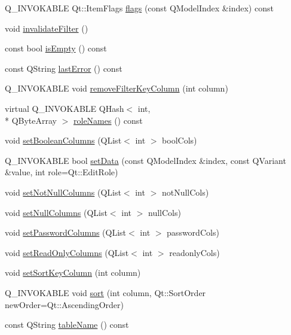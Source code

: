 \begin{DoxyCompactItemize}
\item 
Q\-\_\-\-I\-N\-V\-O\-K\-A\-B\-L\-E Qt\-::\-Item\-Flags \hyperlink{classSH__ExtendedProxyModel_aa12f3d989293da24fb47fd96a080cdc0}{flags} (const Q\-Model\-Index \&index) const 
\item 
void \hyperlink{classSH__ExtendedProxyModel_a7cfb1803f839023c7ba6fc67b900d76a}{invalidate\-Filter} ()
\item 
const bool \hyperlink{classSH__ExtendedProxyModel_af8e37132288a46f527be0c67b652fdf5}{is\-Empty} () const 
\item 
const Q\-String \hyperlink{classSH__ExtendedProxyModel_afb11fa89e1181d88843ea0f7fb3fe654}{last\-Error} () const 
\item 
Q\-\_\-\-I\-N\-V\-O\-K\-A\-B\-L\-E void \hyperlink{classSH__ExtendedProxyModel_a631c2a56b4a301b9c8a855facec3ac1c}{remove\-Filter\-Key\-Column} (int column)
\item 
virtual Q\-\_\-\-I\-N\-V\-O\-K\-A\-B\-L\-E Q\-Hash$<$ int, \\*
Q\-Byte\-Array $>$ \hyperlink{classSH__ExtendedProxyModel_aead7c7969b112c3d0443051ae6a4757a}{role\-Names} () const 
\item 
void \hyperlink{classSH__ExtendedProxyModel_a2acefd1604abfef312fdaa65e57c2234}{set\-Boolean\-Columns} (Q\-List$<$ int $>$ bool\-Cols)
\item 
Q\-\_\-\-I\-N\-V\-O\-K\-A\-B\-L\-E bool \hyperlink{classSH__ExtendedProxyModel_aaaddcc27fdce4ef70f242460b8e053da}{set\-Data} (const Q\-Model\-Index \&index, const Q\-Variant \&value, int role=Qt\-::\-Edit\-Role)
\item 
void \hyperlink{classSH__ExtendedProxyModel_a9211b1bc09442298367565d7e0f62de4}{set\-Not\-Null\-Columns} (Q\-List$<$ int $>$ not\-Null\-Cols)
\item 
void \hyperlink{classSH__ExtendedProxyModel_a2a5734c26bb72fb11e50b9036914d987}{set\-Null\-Columns} (Q\-List$<$ int $>$ null\-Cols)
\item 
void \hyperlink{classSH__ExtendedProxyModel_a4bbea95e7483aeeef4709c12e5ef61c5}{set\-Password\-Columns} (Q\-List$<$ int $>$ password\-Cols)
\item 
void \hyperlink{classSH__ExtendedProxyModel_a985d27d4f35a303e0cd453a05910da1d}{set\-Read\-Only\-Columns} (Q\-List$<$ int $>$ readonly\-Cols)
\item 
void \hyperlink{classSH__ExtendedProxyModel_ab8123244a5060aa35f5bce651046b99d}{set\-Sort\-Key\-Column} (int column)
\item 
Q\-\_\-\-I\-N\-V\-O\-K\-A\-B\-L\-E void \hyperlink{classSH__ExtendedProxyModel_a2d5fdb58bf67879e3f3130619b93104a}{sort} (int column, Qt\-::\-Sort\-Order new\-Order=Qt\-::\-Ascending\-Order)
\item 
const Q\-String \hyperlink{classSH__ExtendedProxyModel_abb133e196ca7cf90b9c9b57263e898d6}{table\-Name} () const 
\end{DoxyCompactItemize}

